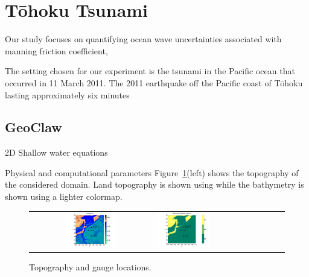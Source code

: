 \section{T\={o}hoku Tsunami}
Our study focuses on quantifying ocean wave uncertainties associated with 
manning friction coefficient, 

The setting chosen for our experiment is the tsunami in the Pacific ocean 
that occurred in 11 March 2011. The 2011 earthquake off the Pacific coast of Tōhoku lasting approximately six minutes


\subsection{GeoClaw}
2D Shallow water equations


Physical and computational parameters
Figure~\ref{fig:setup}(left) shows the topography of the considered domain.
Land topography is shown using while the bathymetry is shown using a lighter colormap.


\begin{figure}[h]
\centering
\begin{tabular}{clc}
\includegraphics[width=0.45\textwidth]{./figures/topo.pdf}  &
\includegraphics[width=0.45\textwidth]{./figures/coef.pdf} 
\label{setup}
\end{tabular}
\caption{Topography and gauge locations.}
\label{fig:setup}
\end{figure}
